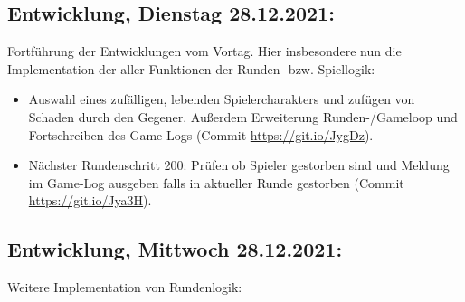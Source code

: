 \subsection{Entwicklung, Dienstag 28.12.2021:}

Fortführung der Entwicklungen vom Vortag. Hier insbesondere nun die Implementation der aller Funktionen der Runden- bzw. Spiellogik:

\begin{itemize}
    \item Auswahl eines zufälligen, lebenden Spielercharakters und zufügen von Schaden durch den Gegener. Außerdem Erweiterung Runden-/Gameloop und Fortschreiben des Game-Logs (Commit \url{https://git.io/JygDz}).
    \item Nächster Rundenschritt 200: Prüfen ob Spieler gestorben sind und Meldung im Game-Log ausgeben falls in aktueller Runde gestorben (Commit \url{https://git.io/Jya3H}). 
\end{itemize}


\subsection{Entwicklung, Mittwoch 28.12.2021:}

Weitere Implementation von Rundenlogik:


